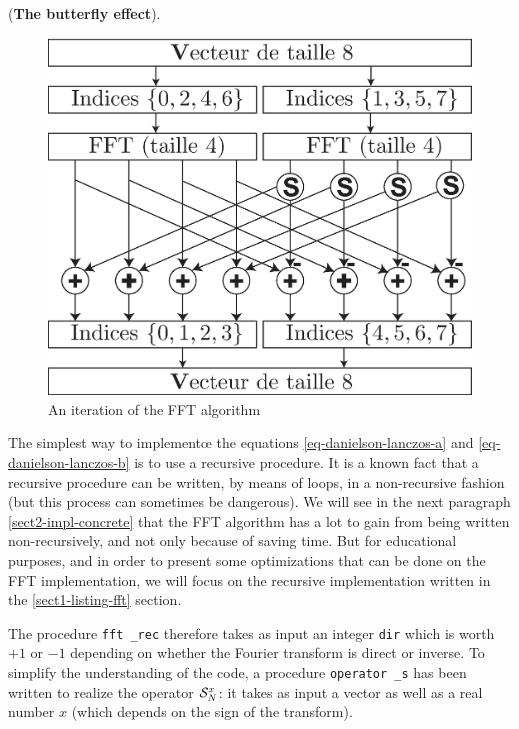 \begin{rem}{(\upshape \textbf{The butterfly effect}).}
\begin{figure}[ht]
              \label{fig-fft-butterfly-2points}
\end{figure}
\begin{figure}[ht] 
    \begin{center}
    \includegraphics [scale = 0.5]{images/fft-butterfly-8points.eps}
    \end{center}
    \caption{An iteration of the FFT algorithm}
              \label{fig-fft-butterfly-8points}
\end{figure}
\end{rem}
 
 
 
 The simplest way to implement{\oe} the equations \eqref{eq-danielson-lanczos-a} and \eqref{eq-danielson-lanczos-b} is to use a recursive procedure. It is a known fact that a recursive procedure can be written, by means of loops, in a non-recursive fashion (but this process can sometimes be dangerous). We will see in the next paragraph \ref{sect2-impl-concrete} that the FFT algorithm has a lot to gain from being written non-recursively, and not only because of saving time. But for educational purposes, and in order to present some optimizations that can be done on the FFT implementation, we will focus on the recursive implementation written in the \ref{sect1-listing-fft} section.
 
 
The procedure \texttt{fft \_rec} therefore takes as input an integer \texttt{dir} which is worth $ + 1 $ or $ -1 $ depending on whether the Fourier transform is direct or inverse. To simplify the understanding of the code, a procedure \texttt{operator \_s} has been written to realize the operator $ \mathcal{S}^x_N $: it takes as input a vector as well as a real number $ x $ (which depends on the sign of the transform).
